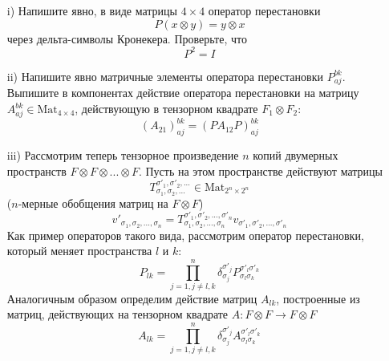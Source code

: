 \documentclass[12pt]{article}
\theoremstyle{definition}
\begin{document}
\begin{enumerate}
\begin{equation}
    \end{equation}
    \begin{itemize}
        \item[i)] Напишите явно, в виде матрицы $4\times4$ оператор перестановки
        \begin{equation}
            P(x\otimes y)=y\otimes x
        \end{equation}
        через дельта-символы Кронекера. Проверьте, что
        \begin{equation}
            P^2=I
        \end{equation}
        \item[ii)] Напишите явно матричные элементы оператора перестановки $P^{bk}_{aj}$. Выпишите в компонентах действие оператора перестановки на матрицу $A^{bk}_{aj}\in\text{Mat}_{4\times4}$, действующую в тензорном квадрате $F_1\otimes F_2$:
        \begin{equation}
            (A_{21})_{aj}^{bk}=(PA_{12}P)^{bk}_{aj}
        \end{equation}
        \item[iii)] Рассмотрим теперь тензорное произведение $n$ копий двумерных пространств $F\otimes F\otimes...\otimes F$. Пусть на этом пространстве действуют матрицы
        \begin{equation}
            T^{\sigma'_1,\sigma'_2,...}_{\sigma_1,\sigma_2,...}\in\text{Mat}_{2^n\times2^n}
        \end{equation}
        ($n$-мерные обобщения матриц на $F\otimes F$)
        \begin{equation}
            v'_{\sigma_1,\sigma_2,...,\sigma_n}=T^{\sigma'_1,\sigma'_2,...,\sigma'_n}_{\sigma_1,\sigma_2,...,\sigma_n}v_{\sigma'_1,\sigma'_2,...,\sigma'_n}
        \end{equation}
        Как пример операторов такого вида, рассмотрим оператор перестановки, который меняет пространства $l$ и $k$:
        \begin{equation}
            P_{lk}=\prod\limits_{j=1,j\neq l,k}^n\delta^{\sigma'_j}_{\sigma_j}P^{\sigma'_l\sigma'_k}_{\sigma_l\sigma_k}
        \end{equation}
        Аналогичным образом определим действие матриц $A_{lk}$, построенные из матриц, действующих на тензорном квадрате $A:F\otimes F\rightarrow F\otimes F$
        \begin{equation}
            A_{lk}=\prod\limits_{j=1,j\neq l,k}^n\delta_{\sigma_j}^{\sigma'_j}A_{\sigma_l\sigma_k}^{\sigma'_l\sigma'_k}
        \end{equation}

\end{itemize}
\end{enumerate}
\end{document}

